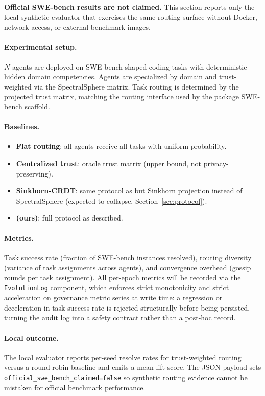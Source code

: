 \textbf{Official SWE-bench results are not claimed.}  This section reports only the
local synthetic evaluator that exercises the same routing surface without Docker,
network access, or external benchmark images.

\paragraph{Experimental setup.}
$N$ agents are deployed on SWE-bench-shaped coding tasks with deterministic hidden
domain competencies.  Agents are specialized by domain and trust-weighted via the
SpectralSphere matrix.  Task routing is determined by the projected trust matrix,
matching the routing interface used by the package SWE-bench scaffold.

\paragraph{Baselines.}
\begin{itemize}
  \item \textbf{Flat routing}: all agents receive all tasks with uniform probability.
  \item \textbf{Centralized trust}: oracle trust matrix (upper bound, not privacy-preserving).
  \item \textbf{Sinkhorn-CRDT}: same protocol as \fedsink{} but Sinkhorn projection
    instead of SpectralSphere (expected to collapse, Section~\ref{sec:protocol}).
  \item \textbf{\fedsink{} (ours)}: full protocol as described.
\end{itemize}

\paragraph{Metrics.}
Task success rate (fraction of SWE-bench instances resolved), routing diversity
(variance of task assignments across agents), and convergence overhead (gossip rounds
per task assignment).
All per-epoch metrics will be recorded via the \texttt{EvolutionLog} component, which
enforces strict monotonicity and strict acceleration on governance metric series at
write time: a regression or deceleration in task success rate is rejected structurally
before being persisted, turning the audit log into a safety contract rather than a
post-hoc record.

\paragraph{Local outcome.}
The local evaluator reports per-seed resolve rates for trust-weighted routing versus a
round-robin baseline and emits a mean lift score.  The JSON payload sets
\texttt{official\_swe\_bench\_claimed=false} so synthetic routing evidence cannot be
mistaken for official benchmark performance.


